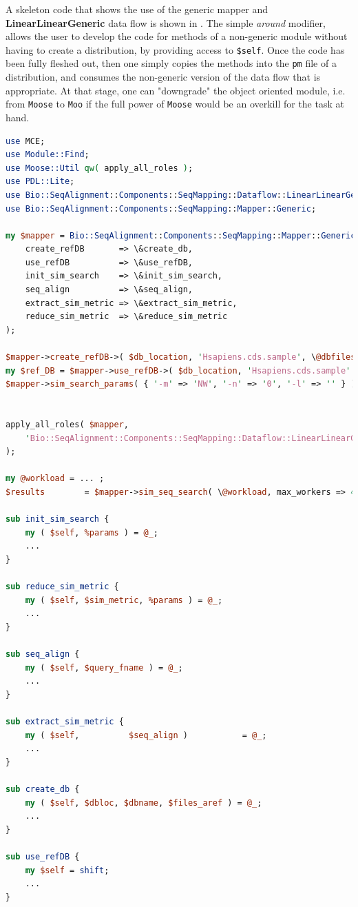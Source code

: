 \documentclass[10pt]{article}
\begin{document}
\newpage
\noindent A skeleton code that shows the use of the generic mapper and \textbf{LinearLinearGeneric} data flow is shown in . The simple \textit{around} modifier, allows the user to develop the code for methods of a non-generic module without having to create a distribution, by providing access to \texttt{\$self}. Once the code has been fully fleshed out, then one simply copies the methods into the \texttt{pm} file of a distribution, and consumes the non-generic version of the data flow that is appropriate. At that stage, one can "downgrade" the object oriented module, i.e. from \texttt{Moose} to \texttt{Moo} if the full power of \texttt{Moose} would be an overkill for the task at hand.


\begin{lstlisting}[language=Perl,basicstyle=\footnotesize,frame=none,caption={Perl code for the \texttt{sim\_seq\_search} of the \textbf{SkeletonGenericMapper} role.},label={lst:SkeletonMapperCode},captionpos=b]
use MCE;
use Module::Find;
use Moose::Util qw( apply_all_roles );
use PDL::Lite;
use Bio::SeqAlignment::Components::SeqMapping::Dataflow::LinearLinearGeneric;
use Bio::SeqAlignment::Components::SeqMapping::Mapper::Generic;

my $mapper = Bio::SeqAlignment::Components::SeqMapping::Mapper::Generic->new(
    create_refDB       => \&create_db,
    use_refDB          => \&use_refDB,
    init_sim_search    => \&init_sim_search,
    seq_align          => \&seq_align,
    extract_sim_metric => \&extract_sim_metric,
    reduce_sim_metric  => \&reduce_sim_metric
);

$mapper->create_refDB->( $db_location, 'Hsapiens.cds.sample', \@dbfiles );
my $ref_DB = $mapper->use_refDB->( $db_location, 'Hsapiens.cds.sample' );
$mapper->sim_search_params( { '-m' => 'NW', '-n' => '0', '-l' => '' } ); 


apply_all_roles( $mapper,
    'Bio::SeqAlignment::Components::SeqMapping::Dataflow::LinearLinearGeneric'
);

my @workload = ... ;
$results        = $mapper->sim_seq_search( \@workload, max_workers => 4 );

sub init_sim_search {
    my ( $self, %params ) = @_;
    ...
}    

sub reduce_sim_metric {
    my ( $self, $sim_metric, %params ) = @_;
    ...
}

sub seq_align {
    my ( $self, $query_fname ) = @_;
    ...
}

sub extract_sim_metric {
    my ( $self,          $seq_align )           = @_;
    ...
}

sub create_db {
    my ( $self, $dbloc, $dbname, $files_aref ) = @_;
    ...
}

sub use_refDB {
    my $self = shift;
    ...
}
\end{lstlisting}
\newpage
\end{document}

